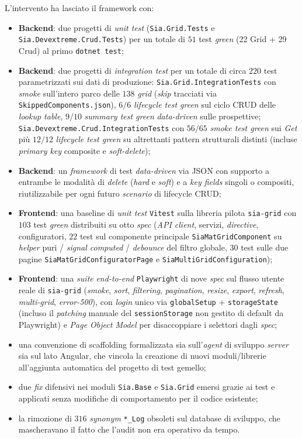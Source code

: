 L'intervento ha lasciato il framework con:
\begin{itemize}
    \item \textbf{Backend}: due progetti di \emph{unit test} (\texttt{Sia.Grid.Tests} e \texttt{Sia.Devextreme.Crud.Tests}) per un totale di $51$ test \emph{green} (22 Grid + 29 Crud) al primo \texttt{dotnet test};
    \item \textbf{Backend}: due progetti di \emph{integration test} per un totale di circa $220$ test parametrizzati sui dati di produzione: \texttt{Sia.Grid.IntegrationTests} con \emph{smoke} sull'intero parco delle $138$ \emph{grid} (\emph{skip} tracciati via \texttt{SkippedComponents.json}), $6/6$ \emph{lifecycle test green} sul ciclo CRUD delle \emph{lookup table}, $9/10$ \emph{summary test green} \emph{data-driven} sulle prospettive; \texttt{Sia.Devextreme.Crud.IntegrationTests} con $56/65$ \emph{smoke test green} sui \emph{Get} più $12/12$ \emph{lifecycle test green} su altrettanti pattern strutturali distinti (incluse \emph{primary key} composite e \emph{soft-delete});
    \item \textbf{Backend}: un \emph{framework} di test \emph{data-driven} via JSON con supporto a entrambe le modalità di \emph{delete} (\emph{hard} e \emph{soft}) e a \emph{key fields} singoli o compositi, riutilizzabile per ogni futuro \emph{scenario} di lifecycle CRUD;
    \item \textbf{Frontend}: una baseline di \emph{unit test} \texttt{Vitest} sulla libreria pilota \texttt{sia-grid} con $103$ test \emph{green} distribuiti su otto \emph{spec} (\emph{API client}, servizi, \emph{directive}, configuratori, $22$ test sul componente principale \texttt{SiaMatGridComponent} su \emph{helper} puri / \emph{signal computed} / \emph{debounce} del filtro globale, $30$ test sulle due pagine \texttt{SiaMatGridConfiguratorPage} e \texttt{SiaMultiGridConfiguration});
    \item \textbf{Frontend}: una \emph{suite} \emph{end-to-end} \texttt{Playwright} di nove \emph{spec} sul flusso utente reale di \texttt{sia-grid} (\emph{smoke}, \emph{sort}, \emph{filtering}, \emph{pagination}, \emph{resize}, \emph{export}, \emph{refresh}, \emph{multi-grid}, \emph{error-500}), con \emph{login} unico via \texttt{globalSetup} + \texttt{storageState} (incluso il \emph{patching} manuale del \texttt{sessionStorage} non gestito di default da Playwright) e \emph{Page Object Model} per disaccoppiare i selettori dagli \emph{spec};
    \item una convenzione di scaffolding formalizzata sia sull'\emph{agent} di sviluppo \emph{server} sia sul lato Angular, che vincola la creazione di nuovi moduli/librerie all'aggiunta automatica del progetto di test gemello;
    \item due \emph{fix} difensivi nei moduli \texttt{Sia.Base} e \texttt{Sia.Grid} emersi grazie ai test e applicati senza modifiche di comportamento per il codice esistente;
    \item la rimozione di $316$ \emph{synonym} \texttt{*\_Log} obsoleti sul database di sviluppo, che mascheravano il fatto che l'audit non era operativo da tempo.
\end{itemize}

